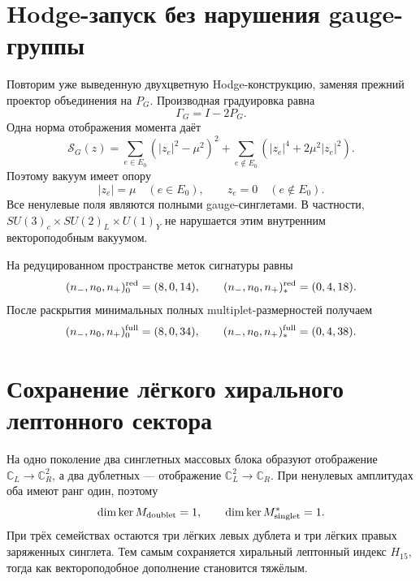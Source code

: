 \section{Hodge-запуск без нарушения gauge-группы}

Повторим уже выведенную двухцветную Hodge-конструкцию, заменяя прежний
проектор объединения на $P_G$. Производная градуировка равна
\begin{equation}
 \Gamma_G=I-2P_G.
 \label{eq:v7-color-selector-grading}
\end{equation}
Одна норма отображения момента даёт
\begin{equation}
 \mathcal S_G(z)=
 \sum_{e\in E_0}(|z_e|^2-\mu^2)^2
 +\sum_{e\notin E_0}(|z_e|^4+2\mu^2|z_e|^2).
 \label{eq:v7-color-selector-hodge-potential}
\end{equation}
Поэтому вакуум имеет опору
\begin{equation}
 |z_e|=\mu\quad(e\in E_0),\qquad
 z_e=0\quad(e\notin E_0).
 \label{eq:v7-color-selector-vacuum}
\end{equation}
Все ненулевые поля являются полными gauge-синглетами. В частности,
$SU(3)_c\times SU(2)_L\times U(1)_Y$ не нарушается этим внутренним
вектороподобным вакуумом.

На редуцированном пространстве меток сигнатуры равны
\begin{equation}
 (n_-,n_0,n_+)_{0}^{\rm red}=(8,0,14),\qquad
 (n_-,n_0,n_+)_{*}^{\rm red}=(0,4,18).
 \label{eq:v7-color-selector-reduced-signatures}
\end{equation}
После раскрытия минимальных полных multiplet-размерностей получаем
\begin{equation}
 (n_-,n_0,n_+)_{0}^{\rm full}=(8,0,34),\qquad
 (n_-,n_0,n_+)_{*}^{\rm full}=(0,4,38).
 \label{eq:v7-color-selector-full-signatures}
\end{equation}

\section{Сохранение лёгкого хирального лептонного сектора}

На одно поколение два синглетных массовых блока образуют отображение
$\mathbb C_L\to\mathbb C_R^2$, а два дублетных --- отображение
$\mathbb C_L^2\to\mathbb C_R$. При ненулевых амплитудах оба имеют ранг
один, поэтому
\begin{equation}
 \dim\ker M_{\rm doublet}=1,
 \qquad
 \dim\ker M_{\rm singlet}^{*}=1.
 \label{eq:v7-color-selector-light-kernels}
\end{equation}
При трёх семействах остаются три лёгких левых дублета и три лёгких правых
заряженных синглета. Тем самым сохраняется хиральный лептонный индекс
$H_{15}$, тогда как вектороподобное дополнение становится тяжёлым.

